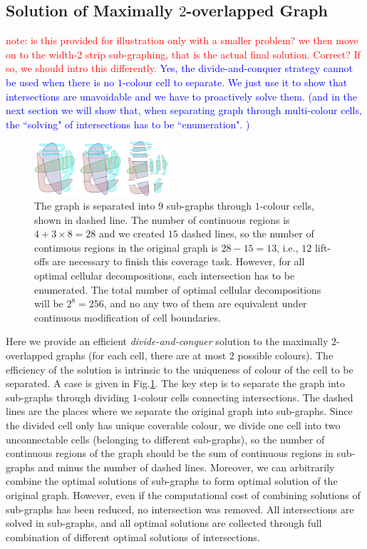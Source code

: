 \documentclass[conference]{IEEEtran}
\begin{document}
\subsection{Solution of Maximally $2$-overlapped Graph}
\textcolor{red}{note: is this provided for illustration only with a smaller problem? we then move on to the width-2 strip sub-graphing, that is the actual final solution. Correct? If so, we should intro this differently. }
\textcolor{blue}{Yes, the divide-and-conquer strategy cannot be used when there is no $1$-colour cell to separate. We just use it to show that intersections are unavoidable and we have to proactively solve them. (and in the next section we will show that, when separating graph through multi-colour cells, the ``solving" of intersections has to be ``enumeration". )
} 

\begin{figure}[t]
\centering
\includegraphics[width=0.44\textwidth]{figures/two_overlapped_graph}
\caption{The graph is separated into $9$ sub-graphs through $1$-colour cells, shown in dashed line. The number of continuous regions is $4+3\times 8 = 28$ and we created $15$ dashed lines, so the number of continuous regions in the original graph is $28-15=13$, i.e., $12$ lift-offs are necessary to finish this coverage task. However, for all optimal cellular decompositions, each intersection has to be enumerated. The total number of optimal cellular decompositions will be $2^8 = 256$, and no any two of them are equivalent under continuous modification of cell boundaries. }\label{fig:two_overlapped_graph}
\end{figure}

Here we provide an efficient \textit{divide-and-conquer} solution to the maximally $2$-overlapped graphs (for each cell, there are at most $2$ possible colours). 
The efficiency of the solution is intrinsic to the uniqueness of colour of the cell to be separated. 
A case is given in Fig.\ref{fig:two_overlapped_graph}. 
The key step is to separate the graph into sub-graphs through dividing $1$-colour cells connecting intersections. 
The dashed lines are the places where we separate the original graph into sub-graphs. Since the divided cell only has unique coverable colour, we divide one cell into two unconnectable cells (belonging to different sub-graphs), so the number of continuous regions of the graph should be the sum of continuous regions in sub-graphs and minus the number of dashed lines. 
Moreover, we can arbitrarily combine the optimal solutions of sub-graphs to form optimal solution of the original graph. 
However, even if the computational cost of combining solutions of sub-graphs has been reduced, no intersection was removed. All intersections are solved in sub-graphs, and all optimal solutions are collected through full combination of different optimal solutions of intersections. 
\end{document}
